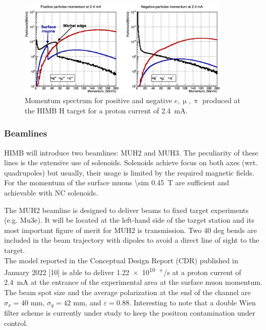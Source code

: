 \begin{refsection}
        \begin{figure}[h]
            \centering
            \includegraphics[width=0.9\textwidth]{Figures/Introduction/himb_momenta.png}
            \caption[HIMB: momentum spectra]{Momentum spectrum for positive and negative $e,\upmu,\uppi$ produced at the HIMB H target for a proton current of \SI{2.4}{mA}.}
            \label{fig:himb:momenta}
        \end{figure}
        
        \subsubsection{Beamlines}
        HIMB will introduce two beamlines: MUH2 and MUH3.
        The peculiarity of these lines is the extensive use of solenoids.
        Solenoids achieve focus on both axes (wrt. quadrupoles) but usually, their usage is limited by the required magnetic fields. 
        For the momentum of the surface muons \SI{\sim 0.45}{T} are sufficient and achievable with NC solenoids. 
        
        The MUH2 beamline is designed to deliver beams to fixed target experiments (e.g. Mu3e). It will be located at the left-hand side of the target station and its most important figure of merit for MUH2 is transmission.
        Two 40 deg bends are included in the beam trajectory with dipoles to avoid a direct line of sight to the target.\\
        The model reported in the Conceptual Design Report (CDR) published in January 2022 [10] is able to deliver \SI{1.22e10}{\upmu^+/s} at a proton current of \SI{2.4}{mA} at the entrance of the experimental area at the surface muon momentum. 
        The beam spot size and the average polarization at the end of the channel are $\sigma_x = 40$ mm, $\sigma_y = 42$ mm, and $\varepsilon = 0.88$.
        Interesting to note that a double Wien filter scheme is currently under study to keep the positron contamination under control.
 

\end{refsection}
